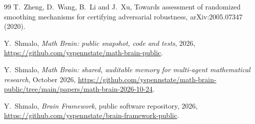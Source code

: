 \documentclass[11pt]{amsart}
\theoremstyle{definition}
\theoremstyle{remark}
\begin{document}
\begin{thebibliography}{99}
T.~Zheng, D.~Wang, B.~Li and J.~Xu, Towards assessment of randomized smoothing mechanisms for certifying
adversarial robustness, arXiv:2005.07347 (2020).

 Y.~Shmalo, \emph{Math Brain: public snapshot, code and tests}, 2026, \url{https://github.com/yspennstate/math-brain-public}.

 Y.~Shmalo, \emph{Math Brain: shared, auditable memory for multi-agent mathematical research}, October 2026, \url{https://github.com/yspennstate/math-brain-public/tree/main/papers/math-brain-2026-10-24}.

 Y.~Shmalo, \emph{Brain Framework}, public software repository, 2026, \url{https://github.com/yspennstate/brain-framework-public}.

\end{thebibliography}
\end{document}
